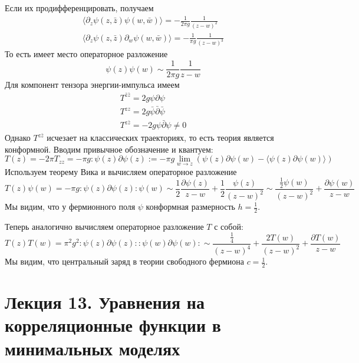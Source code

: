 \documentclass[a4paper,12pt]{article}
\theoremstyle{definition}
\theoremstyle{definition}
\theoremstyle{definition}
\begin{document}
Если их продифференцировать, получаем
\begin{eqnarray}
  \label{eq:294}
  \langle \partial_z \psi(z,\bar z) \psi(w,\bar w) \rangle=-\frac{1}{2\pi g} \frac{1}{(z-w)^2}\\
  \langle \partial_z \psi(z,\bar z) \partial_w \psi(w,\bar w) \rangle=-\frac{1}{\pi g} \frac{1}{(z-w)^3}
\end{eqnarray}
То есть имеет место операторное разложение
\begin{equation}
  \label{eq:295}
  \psi(z)\psi(w)\sim \frac{1}{2\pi g} \frac{1}{z-w}
\end{equation}
Для компонент тензора энергии-импульса имеем
\begin{eqnarray}
  \label{eq:296}
  T^{\bar z\bar z} =2g\psi\partial \psi\\
  T^{ z z} =2g\bar \psi\bar\partial \bar \psi\\
  T^{ z\bar z} =-2g\psi\bar\partial \psi\neq 0
\end{eqnarray}
Однако $T^{z\bar z}$ исчезает на классических траекториях, то есть теория является конформной.
Вводим привычное обозначение и квантуем:
\begin{equation}
  \label{eq:297}
  T(z)=-2\pi T_{zz}=-\pi g :\psi(z) \partial \psi(z):=-\pi g\lim_{w\to z}(\psi(z)\partial \psi(w) -\langle\psi(z) \partial \psi(w)\rangle)
\end{equation}
Используем теорему Вика и вычисляем операторное разложение
\begin{equation}
  \label{eq:298}
  T(z) \psi(w)=-\pi g:\psi(z)\partial \psi(z) :\psi(w) \sim \frac{1}{2}\frac{\partial \psi(z)}{z-w} +\frac{1}{2}\frac{\psi(z)}{(z-w)^2} \sim \frac{\frac{1}{2} \psi(w)}{(z-w)^2} +\frac{\partial \psi(w)}{z-w}
\end{equation}
Мы видим, что у фермионного поля $\psi$ конформная размерность $h=\frac{1}{2}$. 

Теперь аналогично вычисляем операторное разложение $T$ с собой:
\begin{equation}
  \label{eq:299}
  T(z)T(w)=\pi^2 g^2 :\psi(z)\partial \psi(z)::\psi(w)\partial \psi(w): \sim \frac{\frac{1}{4}}{(z-w)^4} +\frac{2T(w)}{(z-w)^2} +\frac{\partial T(w)}{z-w}
\end{equation}
Мы видим, что центральный заряд в теории свободного фермиона $c=\frac{1}{2}$.


\section{Лекция 13. Уравнения на корреляционные функции в минимальных моделях}
\label{sec:lecture-13}
\end{document}
